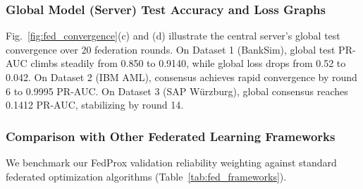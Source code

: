 \subsubsection{Global Model (Server) Test Accuracy and Loss Graphs}\label{sec:fed_server}
Fig.~\ref{fig:fed_convergence}(c) and (d) illustrate the central server's global test convergence over 20 federation rounds. On Dataset 1 (BankSim), global test PR-AUC climbs steadily from 0.850 to 0.9140, while global loss drops from 0.52 to 0.042. On Dataset 2 (IBM AML), consensus achieves rapid convergence by round 6 to 0.9995 PR-AUC. On Dataset 3 (SAP W\"urzburg), global consensus reaches 0.1412 PR-AUC, stabilizing by round 14.

\subsubsection{Comparison with Other Federated Learning Frameworks}\label{sec:fed_comparison}
We benchmark our FedProx validation reliability weighting against standard federated optimization algorithms (Table~\ref{tab:fed_frameworks}).

